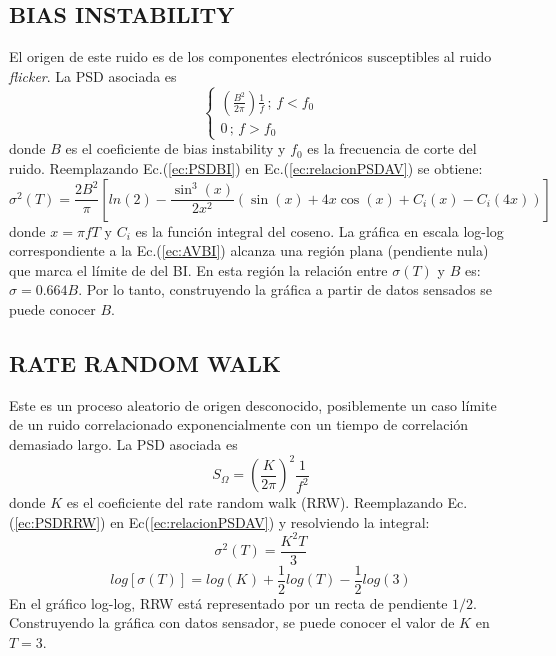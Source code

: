 \documentclass[a4paper,11pt,twoside]{IT-CNEA}
\begin{document}
\subsection{BIAS INSTABILITY}
El origen de este ruido es de los componentes electrónicos susceptibles al ruido \textit{flicker}. La PSD asociada es
\begin{equation}
\begin{cases}
\left( \frac{B^2}{2\pi}\right)\frac{1}{f}\,;\,f<f_0 \\
0\,;\,f>f_0
\end{cases}
\label{ec:PSDBI}
\end{equation}
donde $B$ es el coeficiente de bias instability y $f_0$ es la frecuencia de corte del ruido. Reemplazando Ec.(\ref{ec:PSDBI}) en Ec.(\ref{ec:relacionPSDAV}) se obtiene:
\begin{equation}
\sigma^2(T)=\frac{2B^2}{\pi}\left[ ln(2)-\frac{\sin^3(x)}{2x^2}\left( \sin(x)+4x\cos(x)+C_i(x)-C_i(4x)\right)\right]
\label{ec:AVBI}
\end{equation}
donde $x=\pi fT$ y $C_i$ es la función integral del coseno. La gráfica en escala log-log correspondiente a la Ec.(\ref{ec:AVBI}) alcanza una región plana (pendiente nula) que marca el límite de del BI. En esta región la relación entre $\sigma(T)$ y $B$ es: $\sigma=0.664B$. Por lo tanto, construyendo la gráfica a partir de datos sensados se puede conocer $B$.
\subsection{RATE RANDOM WALK}
Este es un proceso aleatorio de origen desconocido, posiblemente un caso límite de un ruido correlacionado exponencialmente con un tiempo de correlación demasiado largo. La PSD asociada es
\begin{equation}
S_{\Omega}=\left( \frac{K}{2\pi}\right)^2\frac{1}{f^2}
\label{ec:PSDRRW}
\end{equation}
donde $K$ es el coeficiente del rate random walk (RRW). Reemplazando Ec.(\ref{ec:PSDRRW}) en Ec(\ref{ec:relacionPSDAV}) y resolviendo la integral:
\begin{equation}
\sigma^2(T)=\frac{K^2T}{3}
\end{equation}
\begin{equation}
log\left[ \sigma(T)\right]=log(K)+\frac{1}{2}log(T)-\frac{1}{2}log(3)
\end{equation}
En el gráfico log-log, RRW está representado por un recta de pendiente $1/2$. Construyendo la gráfica con datos sensador, se puede conocer el valor de $K$ en $T=3$.
\end{document}
